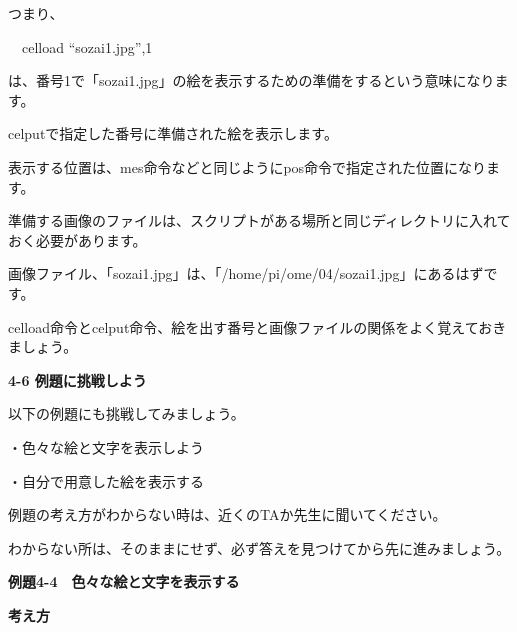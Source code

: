 \documentclass[a4paper,dvipdfmx]{jarticle}
\newcommand\textstyleqwerty[1]{#1}
\begin{document}
\bigskip


\bigskip


\bigskip


\bigskip


\bigskip


\bigskip


\bigskip


\bigskip


\bigskip


\bigskip

つまり、


\bigskip

\ \ celload “sozai1.jpg”,1


\bigskip

は、番号1で「sozai1.jpg」の絵を表示するための準備をするという意味になります。

celputで指定した番号に準備された絵を表示します。

表示する位置は、mes命令などと同じようにpos命令で指定された位置になります。

準備する画像のファイルは、スクリプトがある場所と同じディレクトリに入れておく必要があります。

画像ファイル、「sozai1.jpg」は、「/home/pi/ome/04/sozai1.jpg」にあるはずです。


\bigskip

celload命令とcelput命令、絵を出す番号と画像ファイルの関係をよく覚えておきましょう。


\bigskip


\bigskip

{\bfseries
4-6 例題に挑戦しよう}


\bigskip

以下の例題にも挑戦してみましょう。


\bigskip

・色々な絵と文字を表示しよう

・自分で用意した絵を表示する


\bigskip

例題の考え方がわからない時は、近くのTAか先生に聞いてください。

わからない所は、そのままにせず、必ず答えを見つけてから先に進みましょう。


\bigskip


\bigskip


\bigskip

\clearpage
\textstyleqwerty{\textbf{例題4-4　色々な絵と文字を表示する}}


\bigskip

{\bfseries
考え方}
\end{document}
